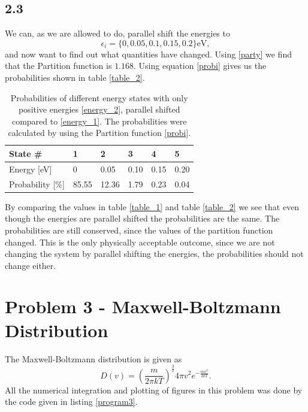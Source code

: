 \documentclass[a4paper,10pt, english]{article}
\begin{document}
\subsection*{2.3}
We can, as we are allowed to do, parallel shift the energies to
\begin{equation}
    \epsilon_i = \{0, 0.05, 0.1, 0.15, 0.2\} \text{eV}, \label{energy_2}
\end{equation}
and now want to find out what quantities have changed. Using \eqref{party}
we find that the Partition function is $1.168$.
Using equation \eqref{probi} gives us the probabilities shown in table \vref{table_2}.
\begin{table}[]
    \begin{center}
    \caption{Probabilities of different energy states with only positive energies \eqref{energy_2}, parallel shifted compared to \eqref{energy_1}. The probabilities were calculated by using the Partition function \eqref{probi}.}    \begin{tabular}{@{}llllll@{}}
    \toprule
    State \#                & 1     & 2     & 3    & 4    & 5    \\ \midrule
    Energy {[}eV{]}      & 0 & 0.05 & 0.10    & 0.15 & 0.20 \\
    Probability {[}\%{]} & 85.55 & 12.36 & 1.79 & 0.23 & 0.04 \\ \bottomrule
    \end{tabular}
    \label{table_2}
    \end{center}
\end{table}
By comparing the values in table \vref{table_1}
and table \vref{table_2} we see that even though the energies are parallel shifted the probabilities are the same. The probabilities are still conserved, since the values of the partition function changed. This is the only physically acceptable outcome, since we are not changing the system by parallel shifting the energies, the probabilities should not change either. \newpage
\section*{Problem 3 - Maxwell-Boltzmann Distribution}
The Maxwell-Boltzmann distribution is given as
\begin{equation}
    D(v) = \left(\frac{m}{2\pi kT}\right)^{\frac{3}{2}}4\pi v^2e^{-\frac{mv^2}{2kT}}.
\end{equation}
All the numerical integration and plotting of figures in this problem was done by the code given in listing \vref{program3}.
\end{document}
